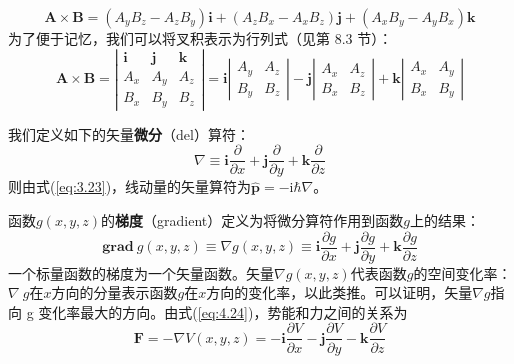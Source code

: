    \begin{equation*}
        \mathbf{A}\times\mathbf{B} = \left(A_yB_z - A_zB_y\right)\mathbf{i} + \left(A_zB_x - A_xB_z\right)\mathbf{j} + \left(A_xB_y - A_yB_x\right)\mathbf{k}
    \end{equation*}
    为了便于记忆，我们可以将叉积表示为行列式（见第 8.3 节）：
    \begin{equation}
        \mathbf{A}\times\mathbf{B} = \left|
            \begin{array}{ccc}
            \mathbf{i} & \mathbf{j} & \mathbf{k} \\
            A_x & A_y & A_z \\
            B_x & B_y & B_z
            \end{array}
        \right| = \mathbf{i}\left|
            \begin{array}{ccc}
            A_y & A_z \\
            B_y & B_z
            \end{array}
        \right| - \mathbf{j}\left|
            \begin{array}{ccc}
            A_x & A_z \\
            B_x & B_z
            \end{array}
        \right| + \mathbf{k}\left|
            \begin{array}{ccc}
            A_x & A_y \\
            B_x & B_y
            \end{array}
        \right|
        \label{eq:5.28}
    \end{equation}

    我们定义如下的矢量\textbf{微分}（del）算符：
    \begin{equation}
        \boxed{
            \nabla \equiv \mathbf{i}\frac{\partial}{\partial x} + \mathbf{j}\frac{\partial}{\partial y} + \mathbf{k}\frac{\partial}{\partial z}
        }
        \label{eq:5.29}
    \end{equation}
    则由式(\ref{eq:3.23})，线动量的矢量算符为$\hat{\mathbf{p}}=-\mathrm{i}\hbar\nabla$。

    函数$g\left(x,y,z\right)$的\textbf{梯度}（gradient）定义为将微分算符作用到函数$g$上的结果：
    \begin{equation}
        \boxed{
            \mathbf{grad} \: g\left(x,y,z\right) \equiv \nabla g\left(x,y,z\right) \equiv \mathbf{i}\frac{\partial g}{\partial x} + \mathbf{j}\frac{\partial g}{\partial y} + \mathbf{k}\frac{\partial g}{\partial z}
        }
        \label{eq:5.30}
    \end{equation}
    一个标量函数的梯度为一个矢量函数。矢量$\nabla g\left(x,y,z\right)$代表函数$g$的空间变化率：$\nabla \:g$在$x$方向的分量表示函数$g$在$x$方向的变化率，以此类推。可以证明，矢量$\nabla g$指向 g 变化率最大的方向。由式(\ref{eq:4.24})，势能和力之间的关系为
    \begin{equation}
        \mathbf{F} = -\nabla V\left(x,y,z\right) = -\mathbf{i}\frac{\partial V}{\partial x} - \mathbf{j}\frac{\partial V}{\partial y} - \mathbf{k}\frac{\partial V}{\partial z}
        \label{eq:5.31}
    \end{equation}

